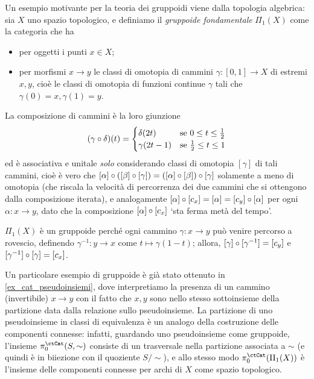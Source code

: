 \begin{definition}\label{es_gruppoide_fondamentale}
	Un esempio motivante per la teoria dei gruppoidi viene dalla topologia algebrica: sia \(X\) uno spazio topologico, e definiamo il \emph{gruppoide fondamentale} \(\Pi_1(X)\) come la categoria che ha
	\begin{itemize}
		\item per oggetti i punti \(x\in X\);
		\item per morfismi \(x\to y\) le classi di omotopia di cammini \(\gamma : [0,1] \to X\) di estremi \(x,y\), cioè le classi di omotopia di funzioni continue \(\gamma\) tali che \(\gamma(0)=x, \gamma(1)=y\).
	\end{itemize}
	La composizione di cammini è la loro giunzione
	\[
		(\gamma\circ \delta)(t) =
		\begin{cases}
			\delta(2t)   & \text{se } 0\le t\le \frac 12  \\
			\gamma(2t-1) & \text{se } \frac 12 \le t\le 1 \\
		\end{cases}\]
	ed è associativa e unitale \emph{solo} considerando classi di omotopia \([\gamma]\) di tali cammini, cioè è vero che \([\alpha] \circ \left([\beta] \circ [\gamma]\right) = \left([\alpha] \circ [\beta]\right) \circ [\gamma]\) solamente a meno di omotopia (che riscala la velocità di percorrenza dei due cammini che si ottengono dalla composizione iterata), e analogamente \([\alpha]\circ [c_x] = [\alpha] = [c_y]\circ [\alpha]\) per ogni \(\alpha : x\to y\), dato che la composizione \([\alpha]\circ [c_x]\) `sta ferma metà del tempo'.

	\(\Pi_1(X)\) è un gruppoide perché ogni cammino \(\gamma : x\to y\) può venire percorso a rovescio, definendo \(\gamma^{-1} : y\to x\) come \(t\mapsto\gamma(1-t)\); allora, \([\gamma]\circ[\gamma^{-1}] = [c_y]\) e \([\gamma^{-1}]\circ [\gamma] = [c_x]\).
\end{definition}
Un particolare esempio di gruppoide è già stato ottenuto in \ref{ex_cat_pseudoinsiemi}, dove interpretiamo la presenza di un cammino (invertibile) \(x\to y\) con il fatto che \(x,y\) sono nello stesso sottoinsieme della partizione data dalla relazione sullo pseudoinsieme. La partizione di uno pseudoinsieme in classi di equivalenza è un analogo della costruzione delle componenti connesse: infatti, guardando uno pseudoinsieme come gruppoide, l'insieme \(\pi_0^\ctCat(S,\sim)\) consiste di un trasversale nella partizione associata a \(\sim\) (e quindi è in biiezione con il quoziente \(S/\sim\)), e allo stesso modo \(\pi_0^\ctCat(\Pi_1(X))\) è l'insieme delle componenti connesse per archi di \(X\) come spazio topologico.

